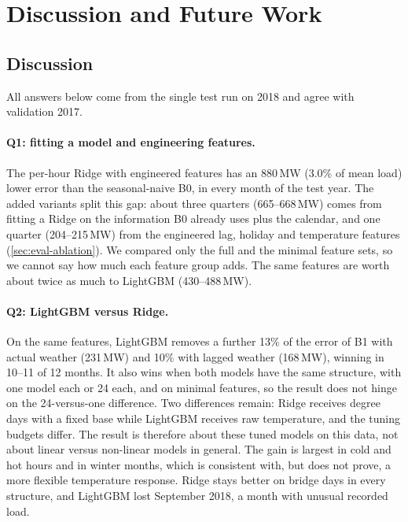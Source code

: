 \section{Discussion and Future Work}
\label{sec:discussion}

\subsection{Discussion}
\label{sec:disc}

All answers below come from the single test run on 2018 and agree with validation 2017.

\paragraph{Q1: fitting a model and engineering features.} The per-hour Ridge with engineered
features has an 880\,MW (3.0\% of mean load) lower error than the seasonal-naive B0, in every month
of the test year. The added variants split this gap: about three quarters (665--668\,MW) comes from
fitting a Ridge on the information B0 already uses plus the calendar, and one quarter (204--215\,MW)
from the engineered lag, holiday and temperature features (\cref{sec:eval-ablation}). We compared
only the full and the minimal feature sets, so we cannot say how much each feature group adds. The
same features are worth about twice as much to LightGBM (430--488\,MW).

\paragraph{Q2: LightGBM versus Ridge.} On the same features, LightGBM removes a further 13\% of the
error of B1 with actual weather (231\,MW) and 10\% with lagged weather (168\,MW), winning in 10--11
of 12 months. It also wins when both models have the same structure, with one model each or 24 each,
and on minimal features, so the result does not hinge on the 24-versus-one difference. Two
differences remain: Ridge receives degree days with a fixed base while LightGBM receives raw
temperature, and the tuning budgets differ. The result is therefore about these tuned models on this
data, not about linear versus non-linear models in general. The gain is largest in cold and hot hours
and in winter months, which is consistent with, but does not prove, a more flexible temperature
response. Ridge stays better on bridge days in every structure, and LightGBM lost September 2018, a
month with unusual recorded load.

